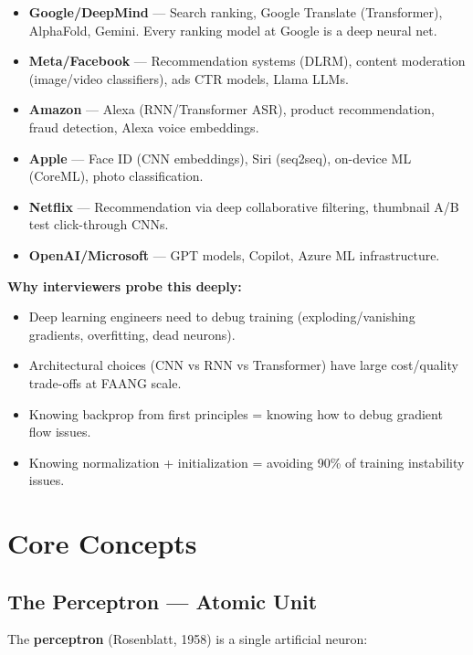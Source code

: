 \documentclass[11pt]{article}
\providecommand{\tightlist}{\setlength{\itemsep}{1pt}\setlength{\parskip}{0pt}}
\begin{document}
\begin{itemize}
\tightlist
\item
  \textbf{Google/DeepMind} --- Search ranking, Google Translate (Transformer), AlphaFold, Gemini. Every ranking model at Google is a deep neural net.
\item
  \textbf{Meta/Facebook} --- Recommendation systems (DLRM), content moderation (image/video classifiers), ads CTR models, Llama LLMs.
\item
  \textbf{Amazon} --- Alexa (RNN/Transformer ASR), product recommendation, fraud detection, Alexa voice embeddings.
\item
  \textbf{Apple} --- Face ID (CNN embeddings), Siri (seq2seq), on-device ML (CoreML), photo classification.
\item
  \textbf{Netflix} --- Recommendation via deep collaborative filtering, thumbnail A/B test click-through CNNs.
\item
  \textbf{OpenAI/Microsoft} --- GPT models, Copilot, Azure ML infrastructure.
\end{itemize}

\textbf{Why interviewers probe this deeply:}

\begin{itemize}
\tightlist
\item
  Deep learning engineers need to debug training (exploding/vanishing gradients, overfitting, dead neurons).
\item
  Architectural choices (CNN vs RNN vs Transformer) have large cost/quality trade-offs at FAANG scale.
\item
  Knowing backprop from first principles = knowing how to debug gradient flow issues.
\item
  Knowing normalization + initialization = avoiding 90\% of training instability issues.
\end{itemize}

\section{Core Concepts}\label{core-concepts}

\subsection{The Perceptron --- Atomic Unit}\label{the-perceptron--atomic-unit}

The \textbf{perceptron} (Rosenblatt, 1958) is a single artificial neuron:

\end{document}
